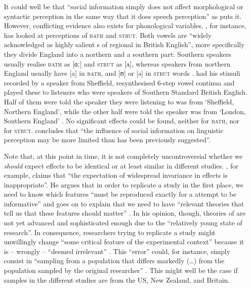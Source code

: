 It could well be that ``social information simply does not affect morphological or syntactic perception in the same way that it does speech perception'' as \textcite[229]{squires2013} puts it.
However, conflicting evidence also exists for phonological variables.
\textcite{lawrence2015}, for instance, has looked at perceptions of \textsc{bath} and \textsc{strut}.
Both vowels are ``widely acknowledged as highly salient s of regional  in British English'', more specifically they divide England into a northern and a southern part: Southern speakers usually realise \textsc{bath} as [ɑː] and \textsc{strut} as [ʌ], whereas speakers from northern England usually have [a] in \textsc{bath}, and [ʊ] or [ə] in \textsc{strut} words \parencite[cf.][1]{lawrence2015}.
\citeauthor{lawrence2015} had his stimuli recorded by a speaker from Sheffield, resynthesised 6-step vowel continua and played these to listeners who were speakers of Southern Standard British English.
Half of them were told the speaker they were listening to was from `Sheffield, Northern England', while the other half were told the speaker was from `London, Southern England' \parencite[cf.][2--3]{lawrence2015}.
No significant  effects could be found, neither for \textsc{bath}, nor for \textsc{strut}.
\textcite[cf.][4]{lawrence2015} concludes that ``the influence of social information on linguistic perception may be more limited than has been previously suggested''.

Note that, at this point in time, it is not completely uncontroversial whether we \emph{should} expect  effects to be identical or at least similar in different studies.
\textcite[45]{cesario2014}, for example, claims that ``the expectation of widespread invariance in  effects is inappropriate''.
He argues that in order to replicate a study in the first place, we need to know which features ``must be reproduced exactly for a  attempt to be informative'' and goes on to explain that we need to have ``relevant theories that tell us that these features should matter'' \parencite[42]{cesario2014}.
In his opinion, though, theories of  are not yet advanced and sophisticated enough due to the ``relatively young state of  research''.
In consequence, researchers trying to replicate a study might unwillingly change ``some critical feature of the experimental context'' because it is -- wrongly -- ``deemed irrelevant'' \parencite[43]{cesario2014}.
This ``error'' could, for instance, simply consist in ``sampling from a population that differs markedly (\ldots) from the population sampled by the original researcher'' \parencite[43]{cesario2014}.
This might well be the case if samples in the different studies are from the US, New Zealand, and Britain.

